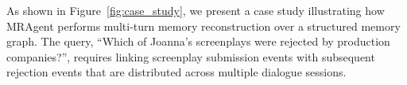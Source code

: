 














As shown in Figure~\ref{fig:case_study}, we present a case study illustrating how
MRAgent performs multi-turn memory reconstruction over a structured memory
graph. 
The query, ``Which of Joanna’s screenplays were rejected by production
companies?'', requires linking screenplay submission events with subsequent
rejection events that are distributed across multiple dialogue sessions.

